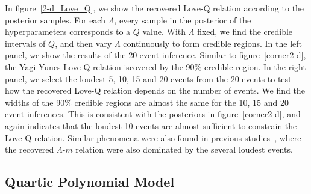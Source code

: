 \documentclass[a4paper,11pt]{article}
\begin{document}
In figure~\ref{2-d_Love_Q}, we show the recovered Love-Q relation according to the 
posterior samples. For each $\Lambda$, every sample in the posterior of the 
hyperparameters corresponds to a $Q$ value. With $\Lambda$ fixed, we find the 
credible intervals of $Q$, and then vary $\Lambda$ continuously to form credible 
regions. In the left panel, we show the results of the 20-event inference. Similar 
to figure~\ref{corner2-d}, the Yagi-Yunes Love-Q relation iscovered by the 90\% credible region. 
In the right panel, we select the loudest 5, 10, 15 and 20 events from the 20 events to test how the recovered Love-Q relation 
depends on the number of events. We find the widths of the 90\% credible regions 
are almost the same for the 10, 15 and 20 event inferences. This is consistent 
with the posteriors in figure~\ref{corner2-d}, and again indicates that the 
loudest 10 events are almost sufficient to constrain the Love-Q relation. Similar 
phenomena were also found in previous studies~\cite{Lackey:2014fwa,Wang:2024xon}, 
where the recovered $\Lambda$-$m$ relation were also dominated by the several loudest events.

\subsection{Quartic Polynomial Model}
\label{subsec:results_quartic}
\end{document}
